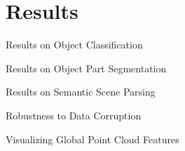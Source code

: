 \section{Results}

\begin{frame}[c]{Results on Object Classification}

\end{frame}

\begin{frame}[c]{Results on Object Part Segmentation}

\end{frame}

\begin{frame}[c]{Results on Semantic Scene Parsing}

\end{frame}

\begin{frame}[c]{Robustness to Data Corruption}

\end{frame}

\begin{frame}[c]{Visualizing Global Point Cloud Features}

\end{frame}
